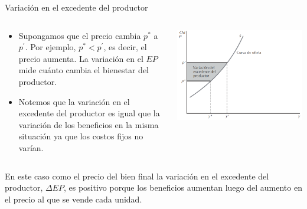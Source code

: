 \documentclass{beamer}
\theoremstyle{definition}
\begin{document}
\begin{frame}{Variaci\'on en el excedente del productor}

\begin{columns}
    \begin{column}[t]{0.48\textwidth}
    \begin{itemize}[leftmargin=*]\small
       \item Supongamos que el precio cambia $p^*$ a $p^{'}$. Por ejemplo, $p^*<p^{'}$, es decir, el precio aumenta. La variación en el $EP$ mide cuánto cambia el bienestar del productor.
        
\item Notemos que la variación en el excedente del productor es igual que la variación de los beneficios en la misma situación ya que los costos fijos
no varían. 

\end{itemize}
    \end{column}
    \begin{column}[t]{0.48\textwidth}
       \begin{center}
\includegraphics[scale=0.39]{figures4/varEP.png}
\end{center} 
    \end{column}
\end{columns}

\medskip
\small
En este caso como el precio del bien final la variación en el excedente del productor, $\Delta EP$, es positivo porque los beneficios aumentan luego del aumento en el precio al que se vende cada unidad.

\end{frame}
\end{document}
